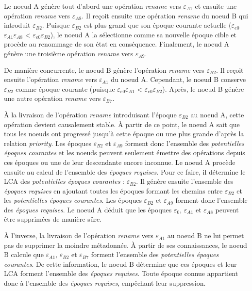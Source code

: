 \documentclass[12pt]{thesul}
\newcommand{\epoch}[1]{$\varepsilon_{#1}$}
\begin{document}

Le noeud A génère tout d'abord une opération \emph{rename} vers \epoch{A1} et ensuite une opération \emph{rename} vers \epoch{A8}.
Il reçoit ensuite une opération \emph{rename} du noeud B qui introduit \epoch{B2}.
Puisque \epoch{B2} est plus grand que son époque courante actuelle (\epoch{e0}\epoch{A1}\epoch{A8} < \epoch{e0}\epoch{B2}), le noeud A la sélectionne comme sa nouvelle époque cible et procède au renommage de son état en conséquence.
Finalement, le noeud A génère une troisième opération \emph{rename} vers \epoch{A9}.

De manière concurrente, le noeud B génère l'opération \emph{rename} vers \epoch{B2}.
Il reçoit ensuite l'opération \emph{rename} vers \epoch{A1} du noeud A.
Cependant, le noeud B conserve \epoch{B2} comme époque courante (puisque \epoch{e0}\epoch{A1} < \epoch{e0}\epoch{B2}).
Après, le noeud B génère une autre opération \emph{rename} vers \epoch{B7}.

À la livraison de l'opération \emph{rename} introduisant l'époque \epoch{B2} au noeud A, cette opération devient causalement stable.
À partir de ce point, le noeud A sait que tous les noeuds ont progressé jusqu'à cette époque ou une plus grande d'après la relation \emph{priority}.
Les époques \epoch{B2} et \epoch{A9} forment donc l'ensemble des \emph{potentielles époques courantes} et les noeuds peuvent seulement émettre des opérations depuis ces époques ou une de leur descendante encore inconnue.
Le noeud A procède ensuite au calcul de l'ensemble des \emph{époques requises}.
Pour ce faire, il détermine le \ac{LCA} des \emph{potentielles époques courantes} : \epoch{B2}.
Il génère ensuite l'ensemble des \emph{époques requises} en ajoutant toutes les époques formant les chemins entre \epoch{B2} et les \emph{potentielles époques courantes}.
Les époques \epoch{B2} et \epoch{A9} forment donc l'ensemble des \emph{époques requises}.
Le noeud A déduit que les époques \epoch{0}, \epoch{A1} et \epoch{A8} peuvent être supprimées de manière sûre.

À l'inverse, la livraison de l'opération \emph{rename} vers \epoch{A1} au noeud B ne lui permet pas de supprimer la moindre métadonnée.
À partir de ses connaissances, le noeud B calcule que \epoch{A1}, \epoch{B2} et \epoch{B7} forment l'ensemble des \emph{potentielles époques courantes}.
De cette information, le noeud B détermine que ces époques et leur \ac{LCA} forment l'ensemble des \emph{époques requises}.
Toute époque connue appartient donc à l'ensemble des \emph{époques requises}, empêchant leur suppression.
\end{document}

